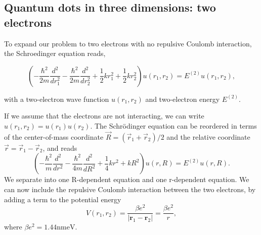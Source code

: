 \documentclass[a4paper]{article}
\begin{document}



\subsection{Quantum dots in three dimensions: two electrons}
\label{2elec}
To expand our problem to two electrons with no repulsive Coulomb interaction, the Schroedinger equation reads,

\begin{equation}
\left(  -\frac{\hbar^2}{2 m} \frac{d^2}{dr_1^2} -\frac{\hbar^2}{2 m} \frac{d^2}{dr_2^2}+ \frac{1}{2}k r_1^2+ \frac{1}{2}k r_2^2\right)u(r_1,r_2)  = E^{(2)} u(r_1,r_2),
\end{equation}


with a two-electron wave function $u(r_1,r_2)$ and two-electron energy $E^{(2)}$.



If we assume that the electrons are not interacting, we can write $u(r_1, r_2) = u(r_1)u(r_2)$. The Schrödinger equation  can be reordered in terms of the center-of-mass coordinate $\vec{R} = (\vec{r}_1 + \vec{r}_2)/2$ and the relative coordinate $\vec{r} = \vec{r}_1 - \vec{r}_2$, and reads
\begin{equation}
\left(  -\frac{\hbar^2}{m} \frac{d^2}{dr^2} -\frac{\hbar^2}{4 m} \frac{d^2}{dR^2}+ \frac{1}{4} k r^2+  kR^2\right)u(r,R)  = E^{(2)} u(r,R).
\label{eq-schr5}
\end{equation}
We separate into one R-dependent equation and one r-dependent equation. We can now include the repulsive Coulomb interaction between the two electrons, by adding a term to the potential energy
\begin{equation}
V(r_1,r_2) = \frac{\beta e^2}{|\mathbf{r}_1-\mathbf{r}_2|}=\frac{\beta e^2}{r},
\end{equation}
where $\beta e^2=1.44\mathrm{nmeV}$.
\end{document}
